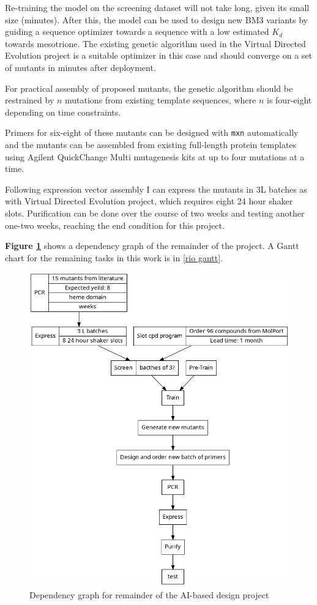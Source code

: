 \documentclass{article}
\begin{document}
\par 
Re-training the model on the screening dataset will not take long, given its small size (minutes). After this, the model can be used to design new BM3 variants by guiding a sequence optimizer towards a sequence with a low estimated $K_d$ towards mesotrione. The existing genetic algorithm used in the Virtual Directed Evolution project is a suitable optimizer in this case and should converge on a set of mutants in minutes after deployment.
\par
For practical assembly of proposed mutants, the genetic algorithm should be restrained by $n$ mutations from existing template sequences, where $n$ is four-eight depending on time constraints.
\par
Primers for six-eight of these mutants can be designed with \texttt{mxn} automatically and the mutants can be assembled from existing full-length protein templates using Agilent QuickChange Multi mutagenesis kits at up to four mutations at a time. %
\par 
Following expression vector assembly I can express the mutants in 3L batches as with Virtual Directed Evolution project, which requires eight 24 hour shaker slots. Purification can be done over the course of two weeks and testing another one-two weeks, reaching the end condition for this project.
\par 
\textbf{Figure \ref{rioG}} shows a dependency graph of the remainder of the project. A Gantt chart for the remaining tasks in this work is in \ref{rio gantt}.


\begin{figure}[H]
	\includegraphics[width=\textwidth]{figs/rioG.png}
	\caption{\label{rioG} Dependency graph for remainder of the AI-based design project}
\end{figure}
\end{document}
